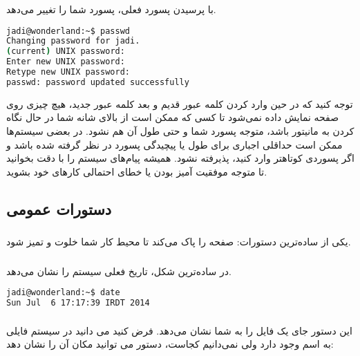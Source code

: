 \subsubsection*{}
با پرسیدن پسورد فعلی، پسورد شما را تغییر می‌دهد.

\begin{latin}
\begin{lstlisting}[language=bash,basicstyle=\ttfamily,linewidth=12cm]
jadi@wonderland:~$ passwd
Changing password for jadi.
(current) UNIX password: 
Enter new UNIX password: 
Retype new UNIX password: 
passwd: password updated successfully
\end{lstlisting}
\end{latin}

توجه کنید که در حین وارد کردن کلمه عبور قدیم و بعد کلمه عبور جدید، هیچ چیزی روی صفحه نمایش داده نمی‌شود تا کسی که ممکن است از بالای شانه شما در حال نگاه کردن به مانیتور باشد، متوجه پسورد شما و حتی طول آن هم نشود.
در بعضی سیستم‌ها ممکن است حداقلی اجباری برای طول یا پیچیدگی پسورد در نظر گرفته شده باشد و اگر پسوردی کوتاهتر وارد کنید، پذیرفته نشود. همیشه پیام‌های سیستم را با دقت بخوانید تا متوجه موفقیت آمیز بودن یا خطای احتمالی کارهای خود بشوید.
\subsection*{دستورات عمومی}
\subsubsection*{}
یکی از ساده‌ترین دستورات: صفحه را پاک می‌کند تا محیط کار شما خلوت و تمیز شود.
\subsubsection*{}
در ساده‌ترین شکل، تاریخ فعلی سیستم را نشان می‌دهد.

\begin{latin}
\begin{lstlisting}[language=bash,basicstyle=\ttfamily,linewidth=12cm]
jadi@wonderland:~$ date
Sun Jul  6 17:17:39 IRDT 2014
\end{lstlisting}
\end{latin}

\subsubsection*{}
این دستور جای یک فایل را به شما نشان می‌دهد. فرض کنید می دانید در سیستم فایلی به اسم 
 وجود دارد ولی نمی‌دانیم کجاست، دستور 
 می توانید مکان آن را نشان دهد:

